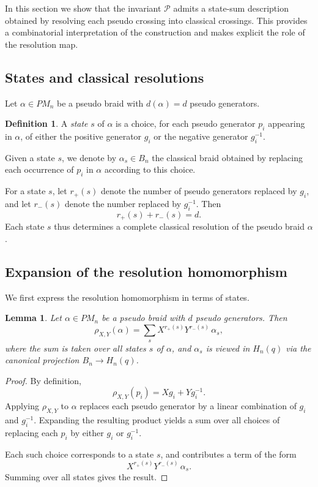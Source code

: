 \documentclass[11pt]{article}
\numberwithin{equation}{section}
\newtheorem{lemma}[theorem]{Lemma}
\theoremstyle{definition}
\newtheorem{definition}[theorem]{Definition}
\begin{document}
In this section we show that the invariant \(\mathcal P\) admits a
state-sum description obtained by resolving each pseudo crossing into classical crossings. This provides a combinatorial interpretation of the construction and makes explicit the role of the resolution map.



\subsection{States and classical resolutions}

Let \(\alpha \in PM_n\) be a pseudo braid with \(d(\alpha)=d\) pseudo generators.

\begin{definition}
A \emph{state} \(s\) of \(\alpha\) is a choice, for each pseudo generator \(p_i\) appearing in \(\alpha\), of either the positive generator \(g_i\) or the negative generator \(g_i^{-1}\).

Given a state \(s\), we denote by \(\alpha_s \in B_n\) the classical braid obtained by replacing each occurrence of \(p_i\) in \(\alpha\) according to this choice.
\end{definition}

For a state \(s\), let \(r_+(s)\) denote the number of pseudo generators replaced by \(g_i\), and let \(r_-(s)\) denote the number replaced by \(g_i^{-1}\). Then
\[
r_+(s) + r_-(s) = d.
\]
Each state \(s\) thus determines a complete classical resolution of the pseudo braid \(\alpha\).


\subsection{Expansion of the resolution homomorphism}

We first express the resolution homomorphism in terms of states.

\begin{lemma}\label{lem:resexp}
Let \(\alpha \in PM_n\) be a pseudo braid with \(d\) pseudo generators. Then
\[
\rho_{X,Y}(\alpha)
=
\sum_s X^{r_+(s)} Y^{r_-(s)} \,\alpha_s,
\]
where the sum is taken over all states \(s\) of \(\alpha\), and \(\alpha_s\) is viewed in \(H_n(q)\) via the canonical projection \(B_n \to H_n(q)\).
\end{lemma}

\begin{proof}
By definition,
\[
\rho_{X,Y}(p_i) = X g_i + Y g_i^{-1}.
\]
Applying \(\rho_{X,Y}\) to \(\alpha\) replaces each pseudo generator by a linear combination of \(g_i\) and \(g_i^{-1}\). Expanding the resulting product yields a sum over all choices of replacing each \(p_i\) by either \(g_i\) or \(g_i^{-1}\).

Each such choice corresponds to a state \(s\), and contributes a term of the form
\[
X^{r_+(s)} Y^{r_-(s)} \,\alpha_s.
\]
Summing over all states gives the result.
\end{proof}
\end{document}
